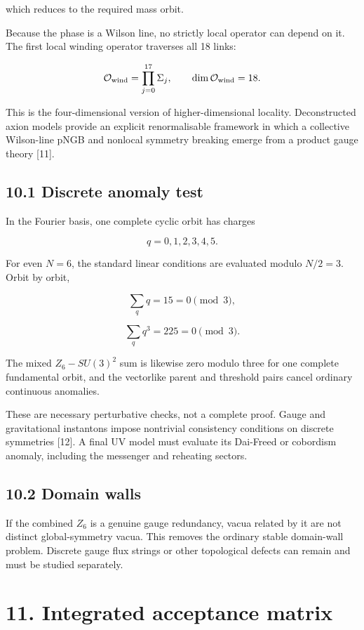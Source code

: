 \documentclass[
  10pt,
]{article}
\begin{document}
which reduces to the required mass orbit.

Because the phase is a Wilson line, no strictly local operator can
depend on it. The first local winding operator traverses all 18 links:

\[
\mathcal O_{\rm wind}
=\prod_{j=0}^{17}\Sigma_j,
\qquad
{\rm dim}\,\mathcal O_{\rm wind}=18.
\]

This is the four-dimensional version of higher-dimensional locality.
Deconstructed axion models provide an explicit renormalisable framework
in which a collective Wilson-line pNGB and nonlocal symmetry breaking
emerge from a product gauge theory {[}11{]}.

\subsection{10.1 Discrete anomaly test}\label{discrete-anomaly-test}

In the Fourier basis, one complete cyclic orbit has charges

\[
q=0,1,2,3,4,5.
\]

For even \(N=6\), the standard linear conditions are evaluated modulo
\(N/2=3\). Orbit by orbit,

\[
\sum_q q=15=0\pmod3,
\]

\[
\sum_q q^3=225=0\pmod3.
\]

The mixed \(Z_6-SU(3)^2\) sum is likewise zero modulo three for one
complete fundamental orbit, and the vectorlike parent and threshold
pairs cancel ordinary continuous anomalies.

These are necessary perturbative checks, not a complete proof. Gauge and
gravitational instantons impose nontrivial consistency conditions on
discrete symmetries {[}12{]}. A final UV model must evaluate its
Dai-Freed or cobordism anomaly, including the messenger and reheating
sectors.

\subsection{10.2 Domain walls}\label{domain-walls}

If the combined \(Z_6\) is a genuine gauge redundancy, vacua related by
it are not distinct global-symmetry vacua. This removes the ordinary
stable domain-wall problem. Discrete gauge flux strings or other
topological defects can remain and must be studied separately.

\section{11. Integrated acceptance
matrix}\label{integrated-acceptance-matrix}
\end{document}
